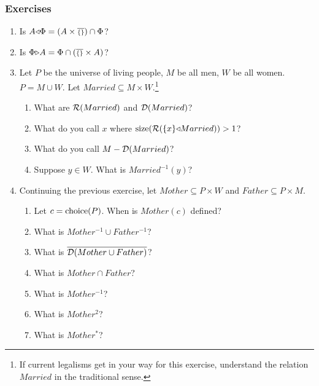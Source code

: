 \subsubsection{Exercises}
\begin{enumerate}\setcounter{enumi}{\value{RunningExercise}}

\item Is $A{\triangleleft}\Phi = (A\times \mbox{$\overline{\scriptstyle\{\}}$}) \cap \Phi$?

\item Is $\Phi{\triangleright} A = \Phi \cap (\mbox{$\overline{\scriptstyle\{\}}$}\times A)$?

\item Let $P$ be the universe of living people, $M$ be all men, 
$W$ be all women.  $P=M\cup W$.  
Let $Married \subseteq M\times W$.\footnote{ If current legalisms get 
in your way for this exercise, understand the relation $Married$ in the 
traditional sense.} \begin{enumerate}

\item What are ${\cal R}(Married)$ and ${\cal D}(Married)$?

\item What do you call $x$ where ${\rm size}({\cal R}(\{x\} {\triangleleft}
Married)) > 1$?

\item What do you call $M - {\cal D}(Married)$?

\item Suppose $y\in W$.  What is $Married^{-1}(y)$?
\end{enumerate}

\item Continuing the previous exercise, let $Mother\subseteq P\times W$ 
and $Father\subseteq P\times M$. 

\begin{enumerate}
\item Let $c=\mbox{\rm choice}(P)$.  When is $Mother(c)$ defined?

\item What is $Mother^{-1}\cup Father^{-1}$?

\item What is $\overline{{\cal D}(Mother\cup Father)}$?

\item What is $Mother\cap Father$?

\item What is $Mother^{-1}$?

\item What is $Mother^{2}$?

\item What is $Mother^*$?

\end{enumerate}

\setcounter{RunningExercise}{\value{enumi}}
\end{enumerate}

